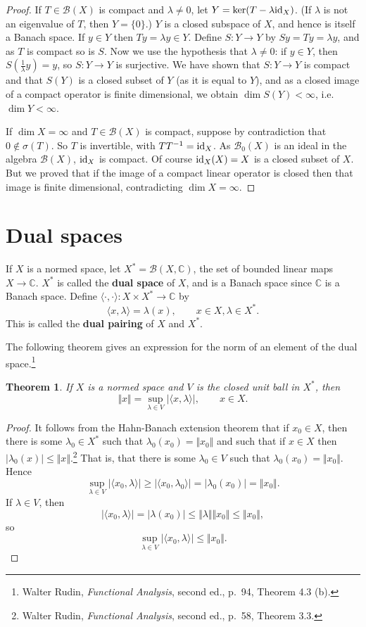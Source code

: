 \documentclass{article}
\newcommand{\inner}[2]{\langle #1, #2 \rangle}
\newcommand{\id}{\ensuremath\mathrm{id}}
\newcommand{\norm}[1]{\Vert #1 \Vert}
\newtheorem{theorem}{Theorem}
\begin{document}
\begin{proof}
If $T \in \mathscr{B}(X)$ is compact and $\lambda \neq 0$, let $Y = \ker (T-\lambda \id_X)$.
(If $\lambda$ is not an eigenvalue of $T$, then $Y=\{0\}$.)
$Y$ is a closed subspace of $X$, and hence is itself a Banach space.
If $y \in Y$ then $Ty=\lambda y \in Y$. Define $S:Y \to Y$ by $Sy=Ty=\lambda y$, and as $T$ is compact so is $S$.
Now we use the hypothesis that $\lambda \neq 0$:
if $y \in Y$, then $S(\frac{1}{\lambda}y)=y$, so $S:Y \to Y$ is surjective. We have shown that
 $S:Y \to Y$ is compact and that $S(Y)$ is a closed subset of $Y$ (as it is equal to $Y$), and as a closed image of a compact operator
 is finite dimensional, we obtain
$\dim S(Y) <\infty$, i.e. $\dim Y< \infty$.

If $\dim X=\infty$ and $T \in \mathscr{B}(X)$ is compact, suppose by contradiction that $0 \not \in \sigma(T)$. So
$T$ is invertible, with $TT^{-1}=\id_X$. As $\mathscr{B}_0(X)$ is an ideal in the algebra $\mathscr{B}(X)$, $\id_X$ is compact. 
Of course $\id_X(X)=X$ is a closed subset of $X$. But we proved that if the image of a compact linear operator is closed then that image
is finite dimensional, contradicting $\dim X=\infty$.
\end{proof}



\section{Dual spaces}
If $X$ is a normed space, let $X^*=\mathscr{B}(X,\mathbb{C})$,  the set of bounded linear maps $X \to \mathbb{C}$. $X^*$ is called the \textbf{dual space} of $X$, and is a Banach space
since $\mathbb{C}$ is a Banach space. Define $\inner{\cdot}{\cdot}:X \times X^* \to \mathbb{C}$ by 
\[
\inner{x}{\lambda}=\lambda(x), \qquad x \in X, \lambda \in X^*.
\]
This is called the \textbf{dual pairing} of $X$ and $X^*$. 

The following theorem gives an expression for the norm of an element of the dual space.\footnote{Walter
Rudin, {\em Functional Analysis}, second ed., p.~94, Theorem 4.3 (b).} 


\begin{theorem}
If $X$ is a normed space and $V$ is the closed unit ball in $X^*$, then
\[
\norm{x}=\sup_{\lambda \in V} |\inner{x}{\lambda}|, \qquad x \in X.
\]
\label{normexpression1}
\end{theorem}
\begin{proof}
It follows from the Hahn-Banach extension theorem that if $x_0 \in X$, then there is some $\lambda_0 \in X^*$ such that $\lambda_0(x_0)=\norm{x_0}$
and such that if $x \in X$ then $|\lambda_0(x)| \leq \norm{x}$.\footnote{Walter Rudin, {\em Functional Analysis}, second ed., 
p.~58, Theorem 3.3.} That is, that there is some $\lambda_0 \in V$ such that $\lambda_0(x_0)=\norm{x_0}$.
Hence
\[
\sup_{\lambda \in V} |\inner{x_0}{\lambda}| \geq |\inner{x_0}{\lambda_0}| = |\lambda_0(x_0)|= \norm{x_0}.
\]
If $\lambda \in V$, then
\[
|\inner{x_0}{\lambda}| = |\lambda(x_0)| \leq \norm{\lambda} \norm{x_0} \leq \norm{x_0},
\]
so
\[
\sup_{\lambda \in V} |\inner{x_0}{\lambda}| \leq \norm{x_0}.
\]
\end{proof}
\end{document}
